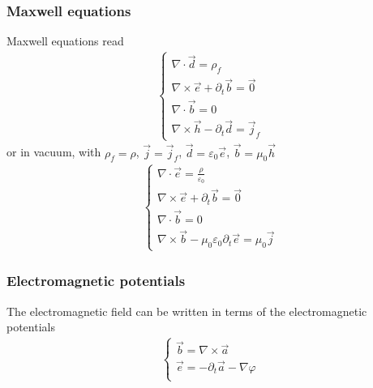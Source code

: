 \documentclass[letterpaper,10pt,english]{jupyterBook}
\begin{document}
\subsubsection{Maxwell equations}
\label{\detokenize{ch/relativity-special/notes:maxwell-equations}}
\sphinxAtStartPar
Maxwell equations read
\begin{equation*}
\begin{split}\begin{cases}
\nabla \cdot \vec{d} = \rho_f \\
\nabla \times \vec{e} + \partial_t \vec{b} = \vec{0} \\
\nabla \cdot \vec{b} = 0 \\
\nabla \times \vec{h} - \partial_t \vec{d} = \vec{j}_f
\end{cases}\end{split}
\end{equation*}
\sphinxAtStartPar
or in vacuum, with \(\rho_f = \rho\), \(\vec{j} = \vec{j}_f\), \(\vec{d} = \varepsilon_0 \vec{e}\), \(\vec{b} = \mu_0 \vec{h}\)
\begin{equation*}
\begin{split}\begin{cases}
\nabla \cdot \vec{e} = \frac{\rho}{\varepsilon_0} \\
\nabla \times \vec{e} + \partial_t \vec{b} = \vec{0} \\
\nabla \cdot \vec{b} = 0 \\
\nabla \times \vec{b} - \mu_0 \varepsilon_0 \partial_t \vec{e} = \mu_0 \vec{j}
\end{cases}\end{split}
\end{equation*}

\subsubsection{Electromagnetic potentials}
\label{\detokenize{ch/relativity-special/notes:electromagnetic-potentials}}
\sphinxAtStartPar
The electromagnetic field can be written in terms of the electromagnetic potentials
\begin{equation*}
\begin{split}\begin{cases}
 \vec{b} = \nabla \times \vec{a} \\
 \vec{e} = -\partial_t \vec{a} - \nabla \varphi \\
\end{cases}\end{split}
\end{equation*}
\end{document}
